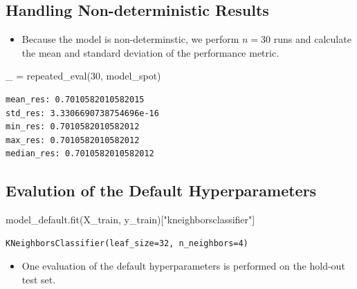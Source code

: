 \documentclass[
  letterpaper,
  DIV=11,
  numbers=noendperiod]{scrreprt}
\newenvironment{Shaded}{\begin{snugshade}}{\end{snugshade}}
\newcommand{\DecValTok}[1]{\textcolor[rgb]{0.68,0.00,0.00}{#1}}
\newcommand{\NormalTok}[1]{\textcolor[rgb]{0.00,0.23,0.31}{#1}}
\newcommand{\OperatorTok}[1]{\textcolor[rgb]{0.37,0.37,0.37}{#1}}
\newcommand{\StringTok}[1]{\textcolor[rgb]{0.13,0.47,0.30}{#1}}
\providecommand{\tightlist}{%
  \setlength{\itemsep}{0pt}\setlength{\parskip}{0pt}}\usepackage{longtable,booktabs,array}
\begin{document}
\hypertarget{handling-non-deterministic-results-3}{%
\subsection{Handling Non-deterministic
Results}\label{handling-non-deterministic-results-3}}

\begin{itemize}
\tightlist
\item
  Because the model is non-determinstic, we perform \(n=30\) runs and
  calculate the mean and standard deviation of the performance metric.
\end{itemize}

\begin{Shaded}
\begin{Highlighting}[]
\NormalTok{\_ }\OperatorTok{=}\NormalTok{ repeated\_eval(}\DecValTok{30}\NormalTok{, model\_spot)}
\end{Highlighting}
\end{Shaded}

\begin{verbatim}
mean_res: 0.7010582010582015
std_res: 3.3306690738754696e-16
min_res: 0.7010582010582012
max_res: 0.7010582010582012
median_res: 0.7010582010582012
\end{verbatim}

\hypertarget{evalution-of-the-default-hyperparameters-3}{%
\subsection{Evalution of the Default
Hyperparameters}\label{evalution-of-the-default-hyperparameters-3}}

\begin{Shaded}
\begin{Highlighting}[]
\NormalTok{model\_default.fit(X\_train, y\_train)[}\StringTok{"kneighborsclassifier"}\NormalTok{]}
\end{Highlighting}
\end{Shaded}

\begin{verbatim}
KNeighborsClassifier(leaf_size=32, n_neighbors=4)
\end{verbatim}

\begin{itemize}
\tightlist
\item
  One evaluation of the default hyperparameters is performed on the
  hold-out test set.
\end{itemize}
\end{document}
